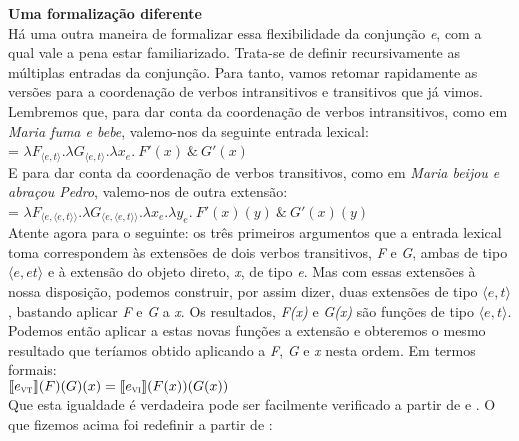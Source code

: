 \n \textbf{Uma formalização diferente}\\

\n Há uma outra maneira de formalizar essa flexibilidade da conjunção \textit{e}, com a qual vale a pena estar familiarizado. Trata-se de definir recursivamente as múltiplas entradas da conjunção. Para tanto, vamos retomar rapidamente as versões para a coordenação de verbos intransitivos e transitivos que já vimos. Lembremos que, para dar conta da coordenação de verbos intransitivos, como em \textit{Maria fuma e bebe}, valemo-nos da seguinte entrada lexical:\\

\n {} = $\lambda F_{\langle e,t\rangle}.\lambda
G_{\langle e,t\rangle}.\lambda x_{e}.\ F'(x)\ \&\ G'(x)$\\

\n E para dar conta da coordenação de verbos transitivos, como em \textit{Maria beijou e abraçou Pedro}, valemo-nos de outra extensão:\\

\n {} = $\lambda F_{\langle e,\langle
	e,t\rangle\rangle}.\lambda G_{\langle e,\langle
	e,t\rangle\rangle}.\lambda x_{e}.\lambda y_{e}.\ F'(x)(y)\ \&\
G'(x)(y)$\\

\n Atente agora para o seguinte: os três primeiros argumentos que
a entrada lexical \den{e$_{vt}$} toma correspondem às extensões de dois
verbos transitivos, \textit{F} e \textit{G}, ambas de tipo
$\langle e, et\rangle$ e à extensão do objeto direto, \textit{x},
de tipo \textit{e}. Mas com essas extensões à nossa disposição,
podemos construir, por assim dizer, duas extensões de tipo
$\langle e,t\rangle$, bastando aplicar \textit{F} e \textit{G} a
\textit{x}. Os resultados, \textit{F(x)} e \textit{G(x)} são
funções de tipo $\langle e,t\rangle$. Podemos então aplicar a
estas novas funções a extensão  e obteremos o mesmo
resultado que teríamos obtido aplicando \den{e$_{vi}$} a
\textit{F}, \textit{G} e \textit{x} nesta ordem. Em termos
formais:\\

\n $\llbracket e_{\text{\textsc{vt}}}\rrbracket (F)(G)(x) =
\llbracket e_{\text{\textsc{vi}}}\rrbracket (F(x))(G(x))$\\

\n Que esta igualdade é verdadeira pode ser facilmente verificado
a partir de  e . O que fizemos acima foi 
redefinir \den{e$_{vt}$} a partir de \den{e$_{vi}$}:\\

